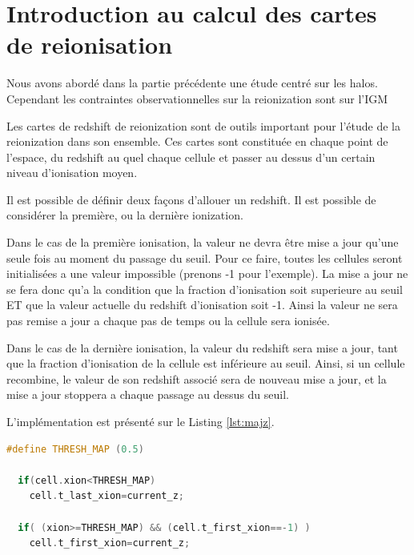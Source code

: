 \chapter{Introduction au calcul des cartes de reionisation}


Nous avons abordé dans la partie précédente une étude centré sur les halos.
Cependant les contraintes observationnelles sur la reionization sont sur l'\ac{IGM}

Les cartes de redshift de reionization sont de outils important pour l'étude de la reionization dans son ensemble.
Ces cartes sont constituée en chaque point de l'espace, du redshift au quel chaque cellule et passer au dessus d'un certain niveau d'ionisation moyen.

Il est possible de définir deux façons d'allouer un redshift.
Il est possible de considérer la première, ou la dernière ionization.

Dans le cas de la première ionisation, la valeur ne devra être mise a jour qu'une seule fois au moment du passage du seuil.
Pour ce faire, toutes les cellules seront initialisées a une valeur impossible (prenons -1 pour l'exemple).
La mise a jour ne se fera donc qu'a la condition que la fraction d'ionisation soit superieure au seuil ET que la valeur actuelle du redshift d'ionisation soit -1.
Ainsi la valeur ne sera pas remise a jour a chaque pas de temps ou la cellule sera ionisée. 

Dans le cas de la dernière ionisation, la valeur du redshift sera mise a jour, tant que la fraction d'ionisation de la cellule est inférieure au seuil.
Ainsi, si un cellule recombine, le valeur de son redshift associé sera de nouveau mise a jour, et la mise a jour stoppera a chaque passage au dessus du seuil.

L'implémentation est présenté sur le Listing \ref{lst:majz}.

\begin{lstlisting}[float=bth,language=c,frame=tb,caption={Mise a jour du redshift de reionisation},label=lst:majz]
  #define THRESH_MAP (0.5)

  if(cell.xion<THRESH_MAP)
    cell.t_last_xion=current_z;

  if( (xion>=THRESH_MAP) && (cell.t_first_xion==-1) )
    cell.t_first_xion=current_z;
\end{lstlisting}


